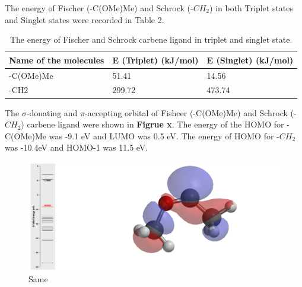 \documentclass[twocolumn]{article} %
\begin{document}
The energy of Fischer (-C(OMe)Me) and Schrock (-$CH_2$) in both Triplet states and Singlet states were recorded in Table 2. 


\begin{table}[h]
\caption{The energy of Fischer and Schrock carbene ligand in triplet and singlet state.}
\begin{tabular}{L{1.0in}C{1.0in}C{1.0in}}\toprule
Name of the molecules & E (Triplet) (kJ/mol) & E (Singlet) (kJ/mol)\\ \hline
-C(OMe)Me             & 51.41         & 14.56         \\
-CH2                  & 299.72        & 473.74    \\\bottomrule   
\end{tabular}
\end{table}


The $\sigma$-donating and $\pi$-accepting orbital of Fishcer (-C(OMe)Me) and Schrock (-$CH_2$) carbene ligand were shown in \textbf{Figrue x}. The energy of the HOMO for -C(OMe)Me was -9.1 eV and LUMO was 0.5 eV. The energy of HOMO for -$CH_2$ was -10.4eV and HOMO-1 was 11.5 eV. 

\begin{figure}[h!]
      \centering
      \includegraphics[width=0.95\columnwidth]{C(OMe)Me HOMO white background.png} %
      \vspace{2mm} %
      \caption{Same}
\end{figure}
\end{document}
